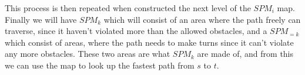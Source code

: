 This process is then repeated when constructed the next level of the $SPM_i$ map. Finally we 
will have $SPM_k$ which will consist of an area where the path freely can traverse, since it 
haven't violated more than the allowed obstacles, and a $SPM_{=k}$ which consist of areas, 
where the path needs to make turns since it can't violate any more obstacles. These two areas 
are what $SPM_k$ are made of, and from this we can use the map to look up the fastest path 
from $s$ to $t$.